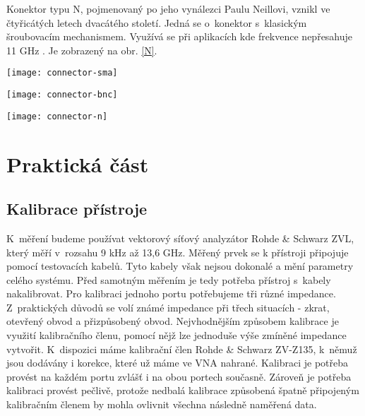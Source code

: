 \documentclass{protokol}
\begin{document}
Konektor typu N, pojmenovaný po jeho vynálezci Paulu Neillovi, vznikl ve čtyřicátých letech dvacátého století. Jedná se o~konektor s~klasickým šroubovacím mechanismem. Využívá se při aplikacích kde frekvence nepřesahuje 11 GHz \cite{rfhandbook}. Je zobrazený na obr. \ref{N}.

\begin{center}
	\captionsetup{justification=centering}
	\begin{minipage}{0.32\textwidth}
		\texttt{[image: connector-sma]}
		\label{SMA}
	\end{minipage}
	\begin{minipage}{0.40\linewidth}
		\texttt{[image: connector-bnc]}
		\label{BNC}
	\end{minipage}
	\begin{minipage}{0.29\textwidth}
		\texttt{[image: connector-n]}
		\label{N}
	\end{minipage}
\end{center}

\section{Praktická část}
\subsection{Kalibrace přístroje}
K~měření budeme používat vektorový síťový analyzátor Rohde \& Schwarz ZVL, který měří v~rozsahu 9 kHz až 13,6 GHz. Měřený prvek se k přístroji připojuje pomocí testovacích kabelů. Tyto kabely však nejsou dokonalé a mění parametry celého systému. Před samotným měřením je tedy potřeba přístroj s~kabely nakalibrovat. Pro kalibraci jednoho portu potřebujeme tři různé impedance. Z~praktických důvodů se volí známé impedance při třech situacích - zkrat, otevřený obvod a přizpůsobený obvod. Nejvhodnějším způsobem kalibrace je využití kalibračního členu, pomocí nějž lze jednoduše výše zmíněné impedance vytvořit. K~dispozici máme kalibrační člen Rohde \& Schwarz ZV-Z135, k~němuž jsou dodávány i korekce, které už máme ve VNA nahrané. Kalibraci je potřeba provést na každém portu zvlášť i na obou portech současně.
Zároveň je potřeba kalibraci provést pečlivě, protože nedbalá kalibrace způsobená špatně připojeným kalibračním členem by mohla ovlivnit všechna následně naměřená data.
\end{document}
